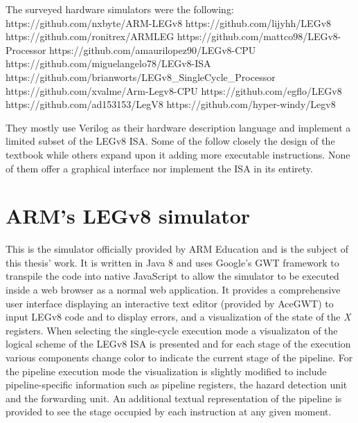 The surveyed hardware simulators were the following:
https://github.com/nxbyte/ARM-LEGv8
https://github.com/lijyhh/LEGv8
https://github.com/ronitrex/ARMLEG
https://github.com/mattco98/LEGv8-Processor
https://github.com/amaurilopez90/LEGv8-CPU
https://github.com/miguelangelo78/LEGv8-ISA
https://github.com/brianworts/LEGv8_SingleCycle_Processor
https://github.com/xvalme/Arm-Legv8-CPU
https://github.com/egflo/LEGv8
https://github.com/ad153153/LegV8
https://github.com/hyper-windy/Legv8

They mostly use Verilog as their hardware description language and implement a limited subset of the LEGv8 ISA. Some of the follow closely the design of the textbook while others expand upon it adding more executable instructions. None of them offer a graphical interface nor implement the ISA in its entirety.

\section*{ARM's LEGv8 simulator}

This is the simulator officially provided by ARM Education and is the subject of this thesis' work. It is written in Java 8 and uses Google's GWT framework to transpile the code into native JavaScript to allow the simulator to be executed inside a web browser as a normal web application. It provides a comprehensive user interface displaying an interactive text editor (provided by AceGWT) to input LEGv8 code and to display errors, and a visualization of the state of the \emph{X} registers.
When selecting the single-cycle execution mode a visualizaton of the logical scheme of the LEGv8 ISA is presented and for each stage of the execution various components change color to indicate the current stage of the pipeline. For the pipeline execution mode the visualization is slightly modified to include pipeline-specific information such as pipeline registers, the hazard detection unit and the forwarding unit. An additional textual representation of the pipeline is provided to see the stage occupied by each instruction at any given moment.

